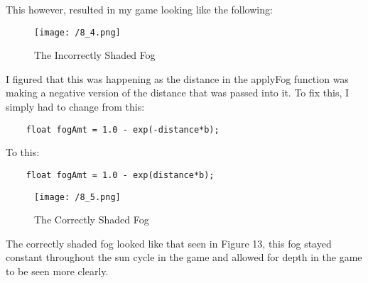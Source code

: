 \documentclass[11pt, oneside, a4paper]{article}
\begin{document}
This however, resulted in my game looking like the following:
\begin{figure}[!ht]
	\centerline{\texttt{[image: /8\_4.png]}}
	\caption{The Incorrectly Shaded Fog}
	\label{fig:figure10}
\end{figure}

\newpage
I figured that this was happening as the distance in the applyFog function was making a negative version of the distance that was passed into it. To fix this, I simply had to change from this:
\begin{lstlisting}
    float fogAmt = 1.0 - exp(-distance*b);
\end{lstlisting}
To this:
\begin{lstlisting}
    float fogAmt = 1.0 - exp(distance*b);
\end{lstlisting}

\begin{figure}[!ht]
	\centerline{\texttt{[image: /8\_5.png]}}
	\caption{The Correctly Shaded Fog}
	\label{fig:figure10}
\end{figure}
The correctly shaded fog looked like that seen in Figure 13, this fog stayed constant throughout the sun cycle in the game and allowed for depth in the game to be seen more clearly.
\end{document}
